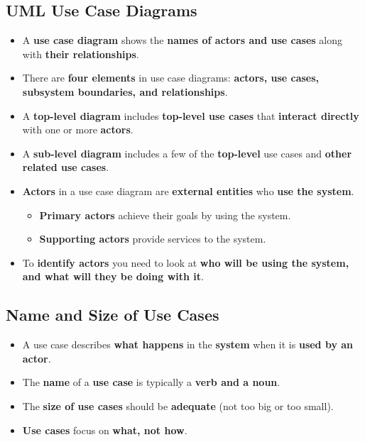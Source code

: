 \documentclass[16pt]{article}
\begin{document}
    \subsection*{UML Use Case Diagrams}
    \begin{itemize}
        \item A \textbf{use case diagram} shows the \textbf{names of actors and use cases} along with \textbf{their relationships}.
        \item There are \textbf{four elements} in use case diagrams: \textbf{actors, use cases, subsystem boundaries, and relationships}.
        \item A \textbf{top-level diagram} includes \textbf{top-level use cases} that \textbf{interact directly} with one or more \textbf{actors}.
        \item A \textbf{sub-level diagram} includes a few of the \textbf{top-level} use cases and \textbf{other related use cases}.
        \item \textbf{Actors} in a use case diagram are \textbf{external entities} who \textbf{use the system}.
        \begin{itemize}
            \item \textbf{Primary actors} achieve their goals by using the system.
            \item \textbf{Supporting actors} provide services to the system.
        \end{itemize}        
        \item To \textbf{identify actors} you need to look at \textbf{who will be using the system, and what will they be doing with it}.
    \end{itemize}

    \subsection*{Name and Size of Use Cases}
    \begin{itemize}
        \item A use case describes \textbf{what happens} in the \textbf{system} when it is \textbf{used by an actor}.
        \item The \textbf{name} of a \textbf{use case} is typically a \textbf{verb and a noun}.
        \item The \textbf{size of use cases} should be \textbf{adequate} (not too big or too small).
        \item \textbf{Use cases} focus on \textbf{what, not how}.
    \end{itemize}
\end{document}
